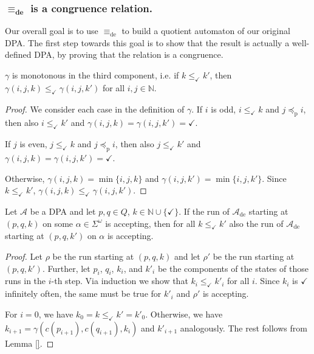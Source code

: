 \subsubsection*{$\boldsymbol{\equiv_\text{de}}$ is a congruence relation.}
Our overall goal is to use $\equiv_\text{de}$ to build a quotient automaton of our original DPA. The first step towards this goal is to show that the result is actually a well-defined DPA, by proving that the relation is a congruence.

\begin{lem}
	$\gamma$ is monotonous in the third component, i.e. if $k \leq_\checkmark k'$, then $\gamma(i, j, k) \leq_\checkmark \gamma(i, j, k')$ for all $i, j \in \mathbb{N}$.
\end{lem}

\begin{proof}
	We consider each case in the definition of $\gamma$. If $i$ is odd, $i \leq_\checkmark k$ and $j \preceq_\text{p} i$, then also $i \leq_\checkmark k'$ and $\gamma(i, j, k) = \gamma(i, j, k') = \checkmark$.
	
	If $j$ is even, $j \leq_\checkmark k$ and $j \preceq_\text{p} i$, then also $j \leq_\checkmark k'$ and $\gamma(i, j, k) = \gamma(i, j, k') = \checkmark$.
	
	Otherwise, $\gamma(i, j, k) = \min \{i, j, k\}$ and $\gamma(i, j, k') = \min \{i, j, k'\}$. Since $k \leq_\checkmark k'$, $\gamma(i, j, k) \leq_\checkmark \gamma(i, j, k')$.
\end{proof}

\begin{lem}
	Let $\mathcal{A}$ be a DPA and let $p, q \in Q$, $k \in \mathbb{N} \cup \{\checkmark\}$. If the run of $\mathcal{A}_\text{de}$ starting at $(p, q, k)$ on some $\alpha \in \Sigma^\omega$ is accepting, then for all $k \leq_\checkmark k'$ also the run of $\mathcal{A}_\text{de}$ starting at $(p, q, k')$ on $\alpha$ is accepting.
\end{lem}

\begin{proof}
	Let $\rho$ be the run starting at $(p, q, k)$ and let $\rho'$ be the run starting at $(p, q, k')$. Further, let $p_i$, $q_i$, $k_i$, and $k'_i$ be the components of the states of those runs in the $i$-th step. Via induction we show that $k_i \leq_\checkmark k'_i$ for all $i$. Since $k_i$ is $\checkmark$ infinitely often, the same must be true for $k'_i$ and $\rho'$ is accepting.
	
	For $i = 0$, we have $k_0 = k \leq_\checkmark k' = k'_0$. Otherwise, we have $k_{i+1} = \gamma(c(p_{i+1}), c(q_{i+1}), k_i)$ and $k'_{i+1}$ analogously. The rest follows from Lemma \ref{}.
\end{proof}

